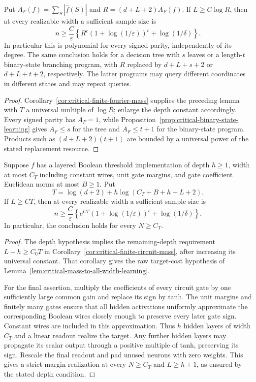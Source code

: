 \begin{theorem}
\label{thm:critical-all-width-fourier-learning}
Put $A_F(f)=\sum_S|\widehat f(S)|$ and $R=(d+L+2)A_F(f)$.
If $L\ge C\log R$, then at every realizable width a sufficient sample
size is
\[
 n\ge\frac C\varepsilon
 \left\{R^c(1+\log(1/\varepsilon))^c+\log(1/\delta)\right\}.
\]
In particular this is polynomial for every signed parity, independently
of its degree. The same conclusion holds for a decision tree with $s$
leaves or a length-$t$ binary-state branching program, with $R$ replaced
by $d+L+s+2$ or $d+L+t+2$, respectively. The latter programs may query
different coordinates in different states and may repeat queries.
\end{theorem}

\begin{proof}
Corollary~\ref{cor:critical-finite-fourier-mass} supplies the preceding
lemma with $T$ a universal multiple of $\log R$; enlarge the depth
constant accordingly. Every signed parity has $A_F=1$, while
Proposition~\ref{prop:critical-binary-state-learning} gives $A_F\le s$
for the tree and $A_F\le t+1$ for the binary-state program. Products
such as $(d+L+2)(t+1)$ are bounded by a universal power of the stated
replacement resource.
\end{proof}

\begin{theorem}
\label{thm:critical-all-width-threshold-learning}
Suppose $f$ has a layered Boolean threshold implementation of depth
$h\ge1$, width at most $C_T$ including constant wires, unit gate margins,
and gate coefficient Euclidean norms at most $B\ge1$. Put
\[
 T=\log(d+2)+h\log(C_T+B+h+L+2).
\]
If $L\ge C T$, then at every realizable width a sufficient sample size is
\[
 n\ge\frac C\varepsilon
   \left\{e^{CT}(1+\log(1/\varepsilon))^c+\log(1/\delta)\right\}.
\]
In particular, the conclusion holds for every $N\ge C_T$.
\end{theorem}

\begin{proof}
The depth hypothesis implies the remaining-depth requirement
$L-h\ge C_0T$ in Corollary~\ref{cor:critical-finite-circuit-mass},
after increasing its universal constant. That corollary gives the
raw target-cost hypothesis of
Lemma~\ref{lem:critical-mass-to-all-width-learning}.

For the final assertion, multiply the coefficients of every circuit
gate by one sufficiently large common gain and replace its sign by
tanh. The unit margins and finitely many gates ensure that all hidden
activations uniformly approximate the corresponding Boolean wires
closely enough to preserve every later gate sign. Constant wires are
included in this approximation. Thus $h$ hidden layers of width $C_T$
and a linear readout realize the target. Any further hidden layers may
propagate its scalar output through a positive multiple of tanh,
preserving its sign. Rescale the final readout and pad unused neurons
with zero weights. This gives a strict-margin realization at every
$N\ge C_T$ and $L\ge h+1$, as ensured by the stated depth condition.
\end{proof}

